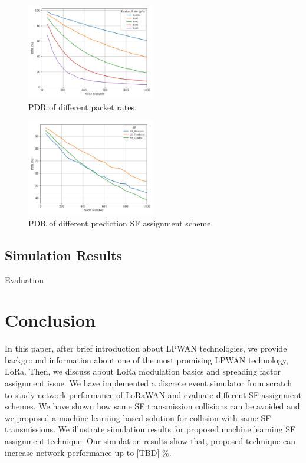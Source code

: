 \documentclass[conference]{IEEEtran}
\begin{document}
\begin{figure}
\centering
\includegraphics[width=0.5\textwidth]{pr_pdr}
\caption{PDR of different packet rates.}
\label{fig:pr_pdr}
\end{figure}

\begin{figure}
\centering
\includegraphics[width=0.5\textwidth]{predict_pdr}
\caption{PDR of different prediction SF assignment scheme.}
\label{fig:pr_pdr}
\end{figure}

\subsection{Simulation Results}
\par [TODO] Evaluation


\section{Conclusion} \label{Conclusion}
\par In this paper, after brief introduction about LPWAN technologies, we provide background information about one of the most promising LPWAN technology, LoRa. Then, we discuss about LoRa modulation basics and spreading factor assignment issue. We have implemented a discrete event simulator from scratch to study network performance of LoRaWAN and evaluate different SF assignment schemes. We have shown how same SF transmission collisions can be avoided and we proposed a machine learning based solution for collision with same SF transmissions. We illustrate simulation results for proposed machine learning SF assignment technique. Our simulation results show that, proposed technique can increase network performance up to [TBD] \%.
\end{document}
